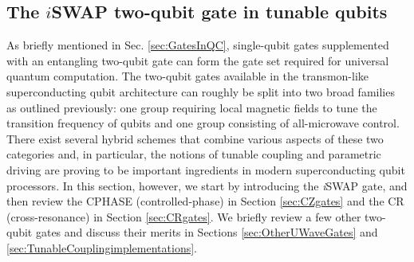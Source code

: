 \documentclass[aip,apr,twocolumn,showpacs,superscriptaddress,groupedaddress,nofootinbib,reprint]{revtex4-1}  %
\newcommand{\iSWAP}{\emph{i}\textsf{SWAP}}
\newcommand{\CPHASE}{\textsf{CPHASE}}
\newcommand{\CR}{\textsf{CR}}
\begin{document}
\subsection{\label{sec:SWAPgates}The $i$\textsf{SWAP} two-qubit gate in tunable qubits}
As briefly mentioned in Sec. \ref{sec:GatesInQC}, single-qubit gates supplemented with an entangling two-qubit gate can form the gate set required for universal quantum computation. The two-qubit gates available in the transmon-like superconducting qubit architecture can roughly be split into two broad families as outlined previously: one group requiring local magnetic fields to tune the transition frequency of qubits and one group consisting of all-microwave control. There exist several hybrid schemes that combine various aspects of these two categories and, in particular, the notions of tunable coupling and parametric driving are proving to be important ingredients in modern superconducting qubit processors\cite{Niskanen2007,VanderPloeg2007,Allman2010,Srinivasan2011,Sirois2015,Chen2014,McKay2016,Caldwell2017,Casparis2018,Yan2018,Didier2018,Reagor2018}. In this section, however, we start by introducing the \iSWAP{} gate, and then review the \CPHASE{} (controlled-phase) in Section \ref{sec:CZgates} and the \CR{} (cross-resonance) in Section \ref{sec:CRgates}. We briefly review a few other two-qubit gates and discuss their merits in Sections \ref{sec:OtherUWaveGates} and \ref{sec:TunableCouplingimplementations}.

\end{document}
